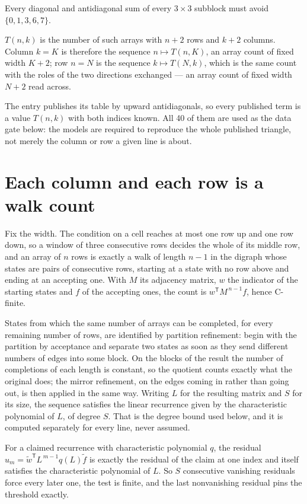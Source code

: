 \documentclass[11pt]{article}
\theoremstyle{definition}
\begin{document}
Every diagonal and antidiagonal sum of every $3\times3$ subblock must avoid $\{0, 1, 3, 6, 7\}$.

$T(n,k)$ is the number of such arrays with $n + 2$ rows and $k + 2$ columns. Column $k = K$ is therefore the sequence $n \mapsto T(n,K)$, an array count of fixed width $K + 2$; row $n = N$ is the sequence $k \mapsto T(N,k)$, which is the same count with the roles of the two directions exchanged --- an array count of fixed width $N + 2$ read across.

The entry publishes its table by upward antidiagonals, so every published term is a value $T(n,k)$ with both indices known. All 40 of them are used as the data gate below: the models are required to reproduce the whole published triangle, not merely the column or row a given line is about.

\section{Each column and each row is a walk count}

Fix the width. The condition on a cell reaches at most one row up and one row down, so a window of three consecutive rows decides the whole of its middle row, and an array of $n$ rows is exactly a walk of length $n-1$ in the digraph whose states are pairs of consecutive rows, starting at a state with no row above and ending at an accepting one. With $M$ its adjacency matrix, $w$ the indicator of the starting states and $f$ of the accepting ones, the count is $w^{\mathsf T}M^{\,n-1}f$, hence C-finite.

States from which the same number of arrays can be completed, for every remaining number of rows, are identified by partition refinement: begin with the partition by acceptance and separate two states as soon as they send different numbers of edges into some block. On the blocks of the result the number of completions of each length is constant, so the quotient counts exactly what the original does; the mirror refinement, on the edges coming in rather than going out, is then applied in the same way. Writing $L$ for the resulting matrix and $S$ for its size, the sequence satisfies the linear recurrence given by the characteristic polynomial of $L$, of degree $S$. That is the degree bound used below, and it is computed separately for every line, never assumed.

For a claimed recurrence with characteristic polynomial $q$, the residual $u_m = \tilde w^{\mathsf T}L^{\,m-1}q(L)\tilde f$ is exactly the residual of the claim at one index and itself satisfies the characteristic polynomial of $L$. So $S$ consecutive vanishing residuals force every later one, the test is finite, and the last nonvanishing residual pins the threshold exactly.
\end{document}
